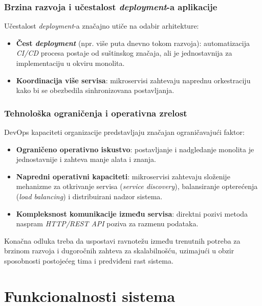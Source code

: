 \documentclass[12pt]{article}
\begin{document}
    \subsubsection*{Brzina razvoja i učestalost \textit{deployment}-a aplikacije}

    Učestalost \textit{deployment}-a značajno utiče na odabir arhitekture:
    \begin{itemize}
        \item \textbf{Čest \textit{deployment}} (npr. više puta dnevno tokom razvoja): automatizacija 
        \textit{CI/CD} procesa postaje od suštinskog značaja, ali je jednostavnija za 
        implementaciju u okviru monolita.
        \item \textbf{Koordinacija više servisa}: mikroservisi zahtevaju naprednu orkestraciju kako 
        bi se obezbedila sinhronizovana postavljanja.
    \end{itemize}

    \subsubsection*{Tehnološka ograničenja i operativna zrelost}

    DevOps kapaciteti organizacije predstavljaju značajan ograničavajući faktor:
    \begin{itemize}
        \item \textbf{Ograničeno operativno iskustvo}: postavljanje i nadgledanje monolita je 
        jednostavnije i zahteva manje alata i znanja.
        \item \textbf{Napredni operativni kapaciteti}: mikroservisi zahtevaju složenije mehanizme 
        za otkrivanje servisa (\textit{service discovery}), balansiranje 
        opterećenja (\textit{load balancing}) i distribuirani nadzor sistema.
        \item \textbf{Kompleksnost komunikacije između servisa}: direktni pozivi metoda naspram 
        \textit{HTTP/REST API} poziva za razmenu podataka.
    \end{itemize}

    Konačna odluka treba da uspostavi ravnotežu između trenutnih potreba za brzinom razvoja i 
    dugoročnih zahteva za skalabilnošću, uzimajući u obzir sposobnosti postojećeg tima i 
    predviđeni rast sistema.

    \newpage
    \section{Funkcionalnosti sistema}
\end{document}
